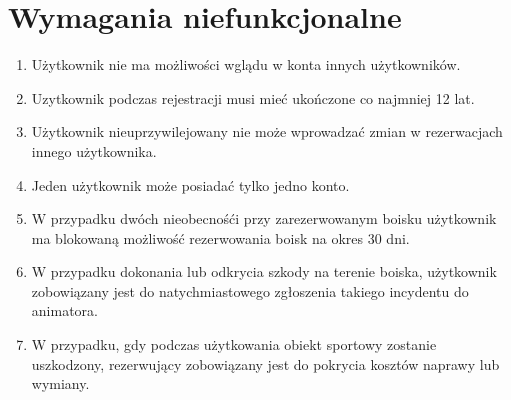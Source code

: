 \documentclass[a4paper,11pt]{article}
\begin{document}
\section {Wymagania niefunkcjonalne}
\begin{enumerate}
	\item Użytkownik nie ma możliwości wglądu w konta innych użytkowników.
	\item Uzytkownik podczas rejestracji musi mieć ukończone co najmniej 12 lat.
	\item Użytkownik nieuprzywilejowany nie może wprowadzać zmian w rezerwacjach innego użytkownika.
	\item Jeden użytkownik może posiadać tylko jedno konto.
	\item W przypadku dwóch nieobecnośći przy zarezerwowanym boisku użytkownik ma blokowaną możliwość rezerwowania boisk na okres 30 dni.
	\item W przypadku dokonania lub odkrycia szkody na terenie boiska, użytkownik zobowiązany jest do natychmiastowego zgłoszenia takiego incydentu do animatora. 
	\item W przypadku, gdy podczas użytkowania obiekt sportowy zostanie uszkodzony, rezerwujący zobowiązany jest do pokrycia kosztów naprawy lub wymiany. 
\end{enumerate}
\end{document}
